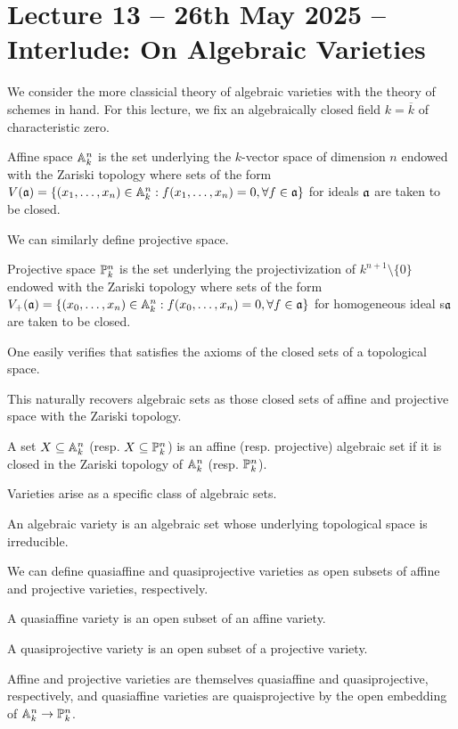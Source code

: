 \section{Lecture 13 -- 26th May 2025 -- Interlude: On Algebraic Varieties}\label{sec: lecture 13}
We consider the more classicial theory of algebraic varieties with the theory of schemes in hand. For this lecture, we fix an algebraically closed field $k=\overline{k}$ of characteristic zero. 
\begin{definition}\label{def: affine space}
    Affine space $\mathbb{A}^{n}_{k}$ is the set underlying the $k$-vector space of dimension $n$ endowed with the Zariski topology where sets of the form $V(\mathfrak{a})=\{(x_{1},\dots,x_{n})\in\mathbb{A}^{n}_{k}:f(x_{1},\dots,x_{n})=0,\forall f\in \mathfrak{a}\}$ for ideals $\mathfrak{a}$ are taken to be closed. 
\end{definition}
We can similarly define projective space. 
\begin{definition}\label{def: projective space}
    Projective space $\mathbb{P}^{n}_{k}$ is the set underlying the projectivization of $k^{n+1}\setminus\{0\}$ endowed with the Zariski topology where sets of the form $V_{+}(\mathfrak{a})=\{(x_{0},\dots,x_{n})\in\mathbb{A}^{n}_{k}:f(x_{0},\dots,x_{n})=0,\forall f\in \mathfrak{a}\}$ for homogeneous ideal s$\mathfrak{a}$ are taken to be closed. 
\end{definition}
\begin{remark}
    One easily verifies that  satisfies the axioms of the closed sets of a topological space.
\end{remark}
This naturally recovers algebraic sets as those closed sets of affine and projective space with the Zariski topology. 
\begin{definition}\label{def: algebraic set}
    A set $X\subseteq\mathbb{A}^{n}_{k}$ (resp. $X\subseteq\mathbb{P}^{n}_{k}$) is an affine (resp. projective) algebraic set if it is closed in the Zariski topology of $\mathbb{A}^{n}_{k}$ (resp. $\mathbb{P}^{n}_{k}$). 
\end{definition}
Varieties arise as a specific class of algebraic sets. 
\begin{definition}\label{def: algebraic variety}
    An algebraic variety is an algebraic set whose underlying topological space is irreducible. 
\end{definition}
We can define quasiaffine and quasiprojective varieties as open subsets of affine and projective varieties, respectively. 
\begin{definition}\label{def: quasiaffine variety}
    A quasiaffine variety is an open subset of an affine variety. 
\end{definition}
\begin{definition}\label{def: quasiprojective variety}
    A quasiprojective variety is an open subset of a projective variety. 
\end{definition}
Affine and projective varieties are themselves quasiaffine and quasiprojective, respectively, and quasiaffine varieties are quaisprojective by the open embedding of $\mathbb{A}^{n}_{k}\to\mathbb{P}^{n}_{k}$. 

